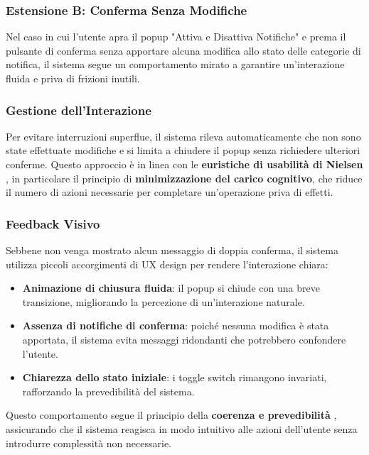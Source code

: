 \clearpage
\newpage

\subsubsection{Estensione B: Conferma Senza Modifiche}

Nel caso in cui l'utente apra il popup "Attiva e Disattiva Notifiche" e prema il pulsante di conferma senza apportare alcuna modifica allo stato delle categorie di notifica, il sistema segue un comportamento mirato a garantire un'interazione fluida e priva di frizioni inutili.

\vspace{0.5 cm}
\subsubsection{Gestione dell'Interazione}

Per evitare interruzioni superflue, il sistema rileva automaticamente che non sono state effettuate modifiche e si limita a chiudere il popup senza richiedere ulteriori conferme. Questo approccio è in linea con le \textbf{euristiche di usabilità di Nielsen} \cite{nielsen1995}, in particolare il principio di \textbf{minimizzazione del carico cognitivo}, che riduce il numero di azioni necessarie per completare un’operazione priva di effetti.

\vspace{0.5cm}
\subsubsection{Feedback Visivo}

Sebbene non venga mostrato alcun messaggio di doppia conferma, il sistema utilizza piccoli accorgimenti di UX design per rendere l'interazione chiara:
\begin{itemize}
    \item \textbf{Animazione di chiusura fluida}: il popup si chiude con una breve transizione, migliorando la percezione di un'interazione naturale.
    \item \textbf{Assenza di notifiche di conferma}: poiché nessuna modifica è stata apportata, il sistema evita messaggi ridondanti che potrebbero confondere l’utente.
    \item \textbf{Chiarezza dello stato iniziale}: i toggle switch rimangono invariati, rafforzando la prevedibilit\`a del sistema.
\end{itemize}

Questo comportamento segue il principio della \textbf{coerenza e prevedibilit\`a} \cite{norman1988}, assicurando che il sistema reagisca in modo intuitivo alle azioni dell'utente senza introdurre complessità non necessarie.


